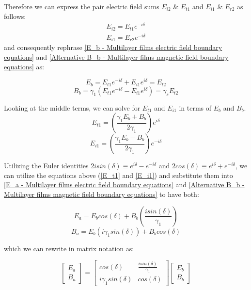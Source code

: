 Therefore we can express the pair electric field sums $E_{i2}$ \& $E_{t1}$ and $E_{i1}$ \& $E_{r2}$ as follows:
\begin{align*}
    E_{i2} = E_{t1}e^{-i\delta} \\
    E_{i1} = E_{r2}e^{-i\delta}
\end{align*}
and consequently rephrase \ref{E_b - Multilayer films electric field boundary equations} and \ref{Alternative B_b - Multilayer films magnetic field boundary equations} as:

\begin{equation} \label{E_b form after phase difference}
E_b = E_{t1}e^{-i\delta} + E_{i1}e^{i\delta} = E_{t2}
\end{equation}
\begin{equation} \label{B_b form after phase difference}
B_b = \gamma_1(E_{t1}e^{-i\delta} - E_{i1}e^{i\delta}) = \gamma_sE_{t2}
\end{equation}

Looking at the middle terms, we can solve for $E_{t1}$ and $E_{i1}$ in terms of $E_b$ and $B_b$.
\begin{equation} \label{E_t1}
E_{t1} = \left(\frac{\gamma_1E_b + B_b}{2\gamma_1}\right)e^{i\delta}
\end{equation}
\begin{equation} \label{E_i1}
E_{i1} = \left(\frac{\gamma_1E_b - B_b}{2\gamma_1}\right)e^{-i\delta}
\end{equation}

Utilizing the Euler identities $2isin(\delta) \equiv e^{i\delta} - e^{-i\delta}$ and $2cos(\delta) \equiv e^{i\delta} + e^{-i\delta}$, we can utilize the equations above (\ref{E_t1} and \ref{E_i1}) and substitute them into \ref{E_a - Multilayer films electric field boundary equations} and \ref{Alternative B_b - Multilayer films magnetic field boundary equations} to have both:

\begin{equation} \label{E_a in terms of E_b and B_b}
E_a = E_bcos(\delta) + B_b\left(\frac{isin(\delta)}{\gamma_1}\right)
\end{equation}
\begin{equation} \label{B_a in terms of E_b and B_b}
B_a = E_b(i\gamma_1sin(\delta)) + B_bcos(\delta)
\end{equation}

which we can rewrite in matrix notation as:

\[
  \begin{bmatrix}\label{Full form transfer matrix}
    E_a  \\
    B_a
  \end{bmatrix} = 
    \begin{bmatrix}
    cos(\delta) & \frac{isin(\delta)}{\gamma_1}    \\
    i\gamma_1sin(\delta) & cos(\delta)
    \end{bmatrix}
    \begin{bmatrix}
    E_b  \\
    B_b
  \end{bmatrix}
\]

